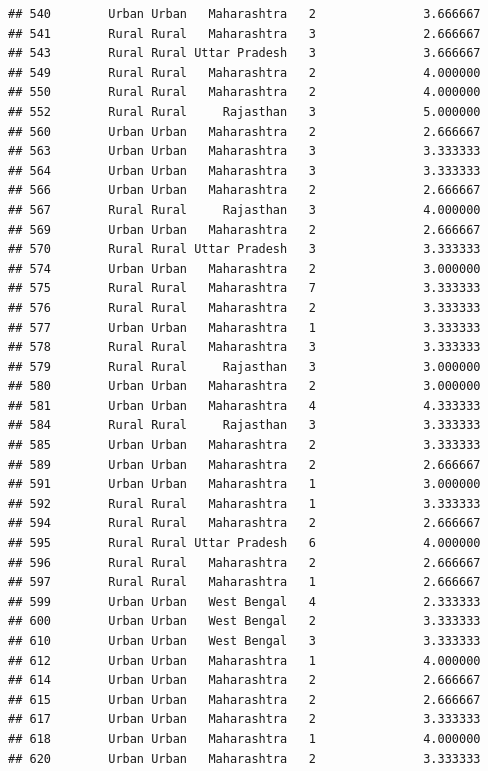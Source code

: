 \documentclass[
]{article}
\begin{document}
\begin{verbatim}
## 540        Urban Urban   Maharashtra   2               3.666667
## 541        Rural Rural   Maharashtra   3               2.666667
## 543        Rural Rural Uttar Pradesh   3               3.666667
## 549        Rural Rural   Maharashtra   2               4.000000
## 550        Rural Rural   Maharashtra   2               4.000000
## 552        Rural Rural     Rajasthan   3               5.000000
## 560        Urban Urban   Maharashtra   2               2.666667
## 563        Urban Urban   Maharashtra   3               3.333333
## 564        Urban Urban   Maharashtra   3               3.333333
## 566        Urban Urban   Maharashtra   2               2.666667
## 567        Rural Rural     Rajasthan   3               4.000000
## 569        Urban Urban   Maharashtra   2               2.666667
## 570        Rural Rural Uttar Pradesh   3               3.333333
## 574        Urban Urban   Maharashtra   2               3.000000
## 575        Rural Rural   Maharashtra   7               3.333333
## 576        Rural Rural   Maharashtra   2               3.333333
## 577        Urban Urban   Maharashtra   1               3.333333
## 578        Rural Rural   Maharashtra   3               3.333333
## 579        Rural Rural     Rajasthan   3               3.000000
## 580        Urban Urban   Maharashtra   2               3.000000
## 581        Urban Urban   Maharashtra   4               4.333333
## 584        Rural Rural     Rajasthan   3               3.333333
## 585        Urban Urban   Maharashtra   2               3.333333
## 589        Urban Urban   Maharashtra   2               2.666667
## 591        Urban Urban   Maharashtra   1               3.000000
## 592        Rural Rural   Maharashtra   1               3.333333
## 594        Rural Rural   Maharashtra   2               2.666667
## 595        Rural Rural Uttar Pradesh   6               4.000000
## 596        Rural Rural   Maharashtra   2               2.666667
## 597        Rural Rural   Maharashtra   1               2.666667
## 599        Urban Urban   West Bengal   4               2.333333
## 600        Urban Urban   West Bengal   2               3.333333
## 610        Urban Urban   West Bengal   3               3.333333
## 612        Urban Urban   Maharashtra   1               4.000000
## 614        Urban Urban   Maharashtra   2               2.666667
## 615        Urban Urban   Maharashtra   2               2.666667
## 617        Urban Urban   Maharashtra   2               3.333333
## 618        Urban Urban   Maharashtra   1               4.000000
## 620        Urban Urban   Maharashtra   2               3.333333

\end{verbatim}
\end{document}
